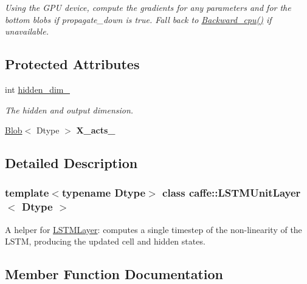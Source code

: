 \begin{DoxyCompactItemize}
\begin{DoxyCompactList}\small\item\em Using the G\+PU device, compute the gradients for any parameters and for the bottom blobs if propagate\+\_\+down is true. Fall back to \mbox{\hyperlink{classcaffe_1_1_l_s_t_m_unit_layer_aab97af46aeebdae3d7f7046aa6ba5f7f}{Backward\+\_\+cpu()}} if unavailable. \end{DoxyCompactList}\end{DoxyCompactItemize}
\subsection*{Protected Attributes}
\begin{DoxyCompactItemize}
\item 
\mbox{\label{classcaffe_1_1_l_s_t_m_unit_layer_a7ffcad2a4e6ca83f03cc88dffa32b7ca}} 
int \mbox{\hyperlink{classcaffe_1_1_l_s_t_m_unit_layer_a7ffcad2a4e6ca83f03cc88dffa32b7ca}{hidden\+\_\+dim\+\_\+}}
\begin{DoxyCompactList}\small\item\em The hidden and output dimension. \end{DoxyCompactList}\item 
\mbox{\label{classcaffe_1_1_l_s_t_m_unit_layer_a908df7793819f3499344318f5ca39574}} 
\mbox{\hyperlink{classcaffe_1_1_blob}{Blob}}$<$ Dtype $>$ {\bfseries X\+\_\+acts\+\_\+}
\end{DoxyCompactItemize}


\subsection{Detailed Description}
\subsubsection*{template$<$typename Dtype$>$\newline
class caffe\+::\+L\+S\+T\+M\+Unit\+Layer$<$ Dtype $>$}

A helper for \mbox{\hyperlink{classcaffe_1_1_l_s_t_m_layer}{L\+S\+T\+M\+Layer}}\+: computes a single timestep of the non-\/linearity of the L\+S\+TM, producing the updated cell and hidden states. 

\subsection{Member Function Documentation}
\mbox{\label{classcaffe_1_1_l_s_t_m_unit_layer_a9c46167bc8b96b28196bc24a5515b531}} 
